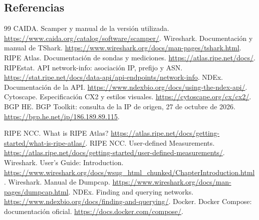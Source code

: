 \subsection{Referencias}\label{anexo:referencias}
\renewcommand{\refname}{}\begin{thebibliography}{99}
 CAIDA. Scamper y manual de la versión utilizada. \url{https://www.caida.org/catalog/software/scamper/}.
 Wireshark. Documentación y manual de TShark. \url{https://www.wireshark.org/docs/man-pages/tshark.html}.
 RIPE Atlas. Documentación de sondas y mediciones. \url{https://atlas.ripe.net/docs/}.
 RIPEstat. API network-info: asociación IP, prefijo y ASN. \url{https://stat.ripe.net/docs/data-api/api-endpoints/network-info}.
 NDEx. Documentación de la API. \url{https://www.ndexbio.org/docs/using-the-ndex-api/}.
 Cytoscape. Especificación CX2 y estilos visuales. \url{https://cytoscape.org/cx/cx2/}.
 BGP HE. BGP Toolkit: consulta de la IP de origen, 27 de octubre de 2026. \url{https://bgp.he.net/ip/186.189.89.115}.


 RIPE NCC. What is RIPE Atlas? \url{https://atlas.ripe.net/docs/getting-started/what-is-ripe-atlas/}.
 RIPE NCC. User-defined Measurements. \url{https://atlas.ripe.net/docs/getting-started/user-defined-measurements/}.
 Wireshark. User's Guide: Introduction. \url{https://www.wireshark.org/docs/wsug_html_chunked/ChapterIntroduction.html}.
 Wireshark. Manual de Dumpcap. \url{https://www.wireshark.org/docs/man-pages/dumpcap.html}.
 NDEx. Finding and querying networks. \url{https://www.ndexbio.org/docs/finding-and-querying/}.
 Docker. Docker Compose: documentación oficial. \url{https://docs.docker.com/compose/}.
\end{thebibliography}
